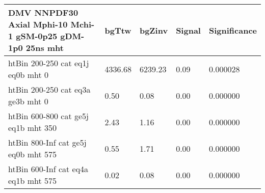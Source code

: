 \documentclass{article}
\begin{document}
 \begin{tabular}{|l|l|l|l|l|}
	\textbf{DMV NNPDF30 Axial Mphi-10 Mchi-1 gSM-0p25 gDM-1p0 25ns mht}	 & 	bgTtw	 & 	bgZinv	 & 	Signal &	 Significance \\ 
	\hline
	htBin 200-250 cat eq1j eq0b mht 0 & 	4336.68	 & 	6239.23	 & 	0.09 	&0.000028 \\ 
	htBin 200-250 cat eq3a ge3b mht 0 & 	0.50	 & 	0.08	 & 	0.00 	&0.000000 \\ 
	htBin 600-800 cat ge5j eq1b mht 350 & 	2.43	 & 	1.16	 & 	0.00 	&0.000000 \\ 
	htBin 800-Inf cat ge5j eq0b mht 575 & 	0.55	 & 	1.71	 & 	0.00 	&0.000000 \\ 
	htBin 600-Inf cat eq4a eq1b mht 575 & 	0.02	 & 	0.08	 & 	0.00 	&0.000000 \\ 
\end{tabular}
\end{document}
